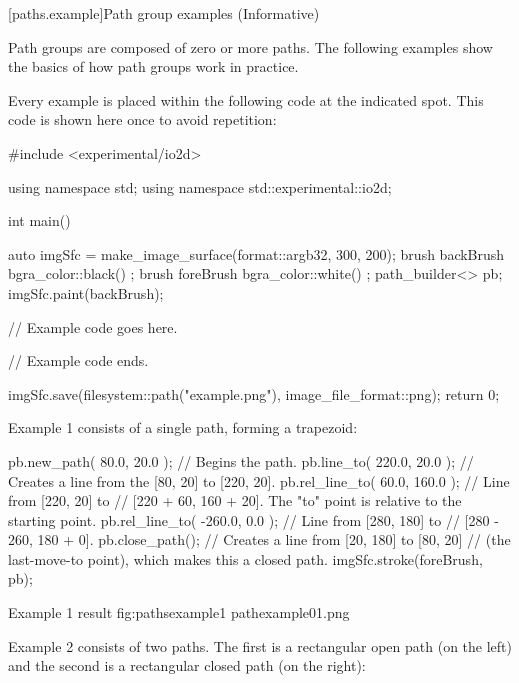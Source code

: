 

 [paths.example]{Path group examples (Informative)}%

\pnum
Path groups are composed of zero or more paths. The following examples show the basics of how path groups work in practice.

\pnum
Every example is placed within the following code at the indicated spot. This code is shown here once to avoid repetition:

\begin{codeblock}
#include <experimental/io2d>

using namespace std;
using namespace std::experimental::io2d;

int main() {
  auto imgSfc = make_image_surface(format::argb32, 300, 200);
  brush backBrush{ bgra_color::black() };
  brush foreBrush{ bgra_color::white() };
  path_builder<> pb{};
  imgSfc.paint(backBrush);
  
  // Example code goes here.

  // Example code ends.
  
  imgSfc.save(filesystem::path("example.png"), image_file_format::png);
  return 0;
}
\end{codeblock}

\pnum
Example 1 consists of a single path, forming a trapezoid:

\begin{codeblock}
  pb.new_path({ 80.0, 20.0 }); // Begins the path.
  pb.line_to({ 220.0, 20.0 }); // Creates a line from the [80, 20] to [220, 20].
  pb.rel_line_to({ 60.0, 160.0 }); // Line from [220, 20] to
    // [220 + 60, 160 + 20]. The "to" point is relative to the starting point.
  pb.rel_line_to({ -260.0, 0.0 }); // Line from [280, 180] to 
    // [280 - 260, 180 + 0].
  pb.close_path(); // Creates a line from [20, 180] to [80, 20] 
    // (the last-move-to point), which makes this a closed path.
  imgSfc.stroke(foreBrush, pb);
\end{codeblock}

\begin{importgraphiciotwod}
{Example 1 result}
{fig:pathsexample1}
{pathexample01.png}
\end{importgraphiciotwod}

\FloatBarrier

\pnum
Example 2 consists of two paths. The first is a rectangular open path (on the left) and the second is a rectangular closed path (on the right):


